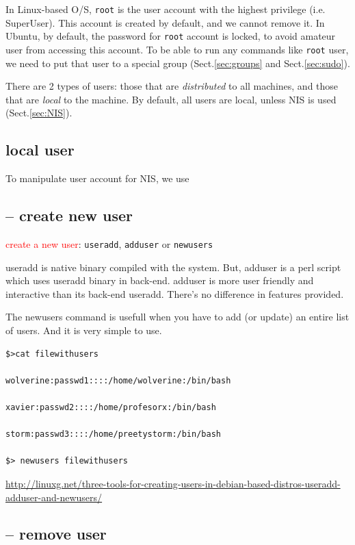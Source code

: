 In Linux-based O/S, \verb!root! is the user account with the highest privilege
(i.e. SuperUser). This account is created by default, and we cannot remove it.
In Ubuntu, by default, the password for \verb!root! account is locked, to avoid amateur user
from accessing this account. To be able to run any commands like \verb!root!
user, we need to put that user to a special group (Sect.\ref{sec:groups} and
Sect.\ref{sec:sudo}).

There are 2 types of users: those that are {\it distributed} to all machines,
and those that are {\it local} to the machine. By default, all users are local,
unless NIS is used (Sect.\ref{sec:NIS}).

\subsection{local user}

To manipulate user account for NIS, we use 

\subsection{-- create new user}

\textcolor{red}{create a new user}:  \verb!useradd!, \verb!adduser! or
  \verb!newusers!

useradd is native binary compiled with the system. But, adduser is a perl script
which uses useradd binary in back-end. adduser is more user friendly and
interactive than its back-end  useradd. There's no difference in features provided.
  
The newusers command is usefull when you have to add (or update) an entire list
of users. And it is very simple to use.
\begin{verbatim}
$>cat filewithusers

wolverine:passwd1::::/home/wolverine:/bin/bash

xavier:passwd2::::/home/profesorx:/bin/bash

storm:passwd3::::/home/preetystorm:/bin/bash

$> newusers filewithusers
\end{verbatim}
\url{http://linuxg.net/three-tools-for-creating-users-in-debian-based-distros-useradd-adduser-and-newusers/}

\subsection{-- remove user}

